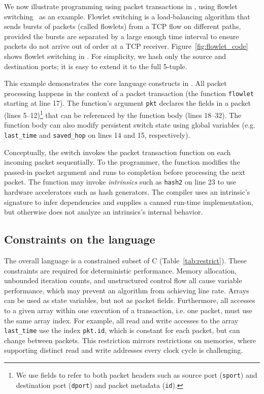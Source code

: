 We now illustrate programming using packet transactions in \pktlanguage, using
flowlet switching~\cite{flowlets} as an example. Flowlet switching is a
load-balancing algorithm that sends bursts of packets (called flowlets) from a
TCP flow on different paths, provided the bursts are separated by a large
enough time interval to ensure packets do not arrive out of order at a TCP
receiver. Figure~\ref{fig:flowlet_code} shows flowlet switching in
\pktlanguage. For simplicity, we hash only the source and destination ports; it
is easy to extend it to the full 5-tuple.

This example demonstrates the core language constructs in \pktlanguage. All
packet processing happens in the context of a packet transaction (the function
\texttt{flowlet} starting at line 17). The function's argument {\tt pkt}
declares the fields in a packet (lines 5--12)\footnote{We use fields to refer
to both packet headers such as source port ({\tt sport}) and destination port
({\tt dport}) and packet metadata ({\tt id}).} that can be referenced by the
function body (lines 18--32).  The function body can also modify persistent
switch state using global variables (e.g.  \texttt{last\_time} and
\texttt{saved\_hop} on lines 14 and 15, respectively).

Conceptually, the switch invokes the packet transaction function on each
incoming packet sequentially. To the programmer, the function modifies the
passed-in packet argument and runs to completion before processing the next
packet.  The function may invoke \textit{intrinsics} such as \texttt{hash2} on
line 23 to use hardware accelerators such as hash generators.  The \pktlanguage
compiler uses an intrinsic's signature to infer dependencies and supplies a
canned run-time implementation, but otherwise does not analyze an intrinsics's
internal behavior.

\subsection{Constraints on the language}

The overall language is a constrained subset of C
(Table~\ref{tab:restrict}).  These constraints are required for
deterministic performance.  Memory allocation, unbounded iteration
counts, and unstructured control flow all cause variable performance,
which may prevent an algorithm from achieving line rate.  Arrays can
be used as state variables, but not as packet fields.
Furthermore, all accesses to a given array within one execution of a
transaction, i.e. one packet, must use the same array index. For
example, all read and write accesses to the array \texttt{last\_time}
use the index \texttt{pkt.id}, which is constant for each packet, but
can change between packets. This restriction mirrors restrictions on
memories, where supporting distinct read and write addresses every
clock cycle is challenging.

